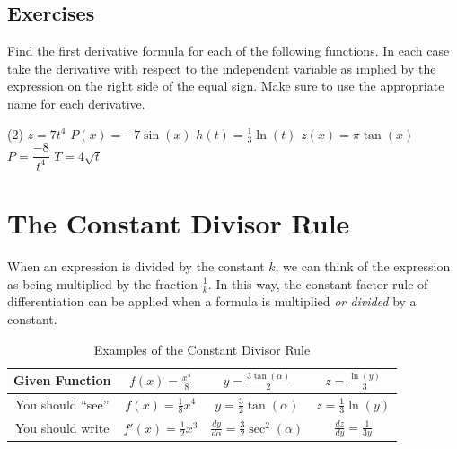 \documentclass[12pt,]{book}
\theoremstyle{plain}
\theoremstyle{definition}
\numberwithin{equation}{section}
\newcommand{\fe}[2]{#1\mathopen{}\left(#2\right)\mathclose{}}
\newcommand{\fd}[1]{#1'}
\newcommand{\lz}[2]{\frac{d#1}{d#2}}
\begin{document}
\subsection[Exercises]{Exercises}\label{exercises-34}
\hypertarget{exercisegroup-73}{\null}Find the first derivative formula for each of the following functions.  In each case take the derivative with respect to the independent variable as implied by the expression on the right side of the equal sign.  Make sure to use the appropriate name for each derivative.%
\par
\begin{exercisegroup}(2)
\exercise[1.]\hypertarget{exercise-357}{\null}\(z=7t^4\)%
\exercise[2.]\hypertarget{exercise-358}{\null}\(\fe{P}{x}=-7\fe{\sin}{x}\)%
\exercise[3.]\hypertarget{exercise-359}{\null}\(\fe{h}{t}=\frac{1}{3}\fe{\ln}{t}\)%
\exercise[4.]\hypertarget{exercise-360}{\null}\(\fe{z}{x}=\pi\fe{\tan}{x}\)%
\exercise[5.]\hypertarget{exercise-361}{\null}\(P=\dfrac{-8}{t^4}\)%
\exercise[6.]\hypertarget{exercise-362}{\null}\(T=4\sqrt{t}\)%
\end{exercisegroup}
\par\smallskip\noindent
\typeout{************************************************}
\typeout{************************************************}
\section[The Constant Divisor Rule]{The Constant Divisor Rule}\label{section-constant-divisor-rule}
When an expression is divided by the constant \(k\), we can think of the expression as being multiplied by the fraction \(\frac{1}{k}\).  In this way, the constant factor rule of differentiation can be applied when a formula is multiplied \emph{or divided} by a constant.%
\begin{table}
\centering
\caption{Examples of the Constant Divisor Rule\label{table-constant-divisor-rule}}
\begin{tabular}{c|c|c|c}
\toprule
Given Function&\(\fe{f}{x}=\frac{x^4}{8}\)&\(y=\frac{3\fe{\tan}{\alpha}}{2}\)&\(z=\frac{\fe{\ln}{y}}{3}\)\\
\midrule
You should ``see''&\(\fe{f}{x}=\frac{1}{8}x^4\)&\(y=\frac{3}{2}\fe{\tan}{\alpha}\)&\(z=\frac{1}{3}\fe{\ln}{y}\)\\
\midrule
You should write&\(\fe{\fd{f}}{x}=\frac{1}{2}x^3\)&\(\lz{y}{\alpha}=\frac{3}{2}\fe{\sec^2}{\alpha}\)&\(\lz{z}{y}=\frac{1}{3y}\)\\
\bottomrule
\end{tabular}
\end{table}
\typeout{************************************************}
\typeout{************************************************}
\end{document}
